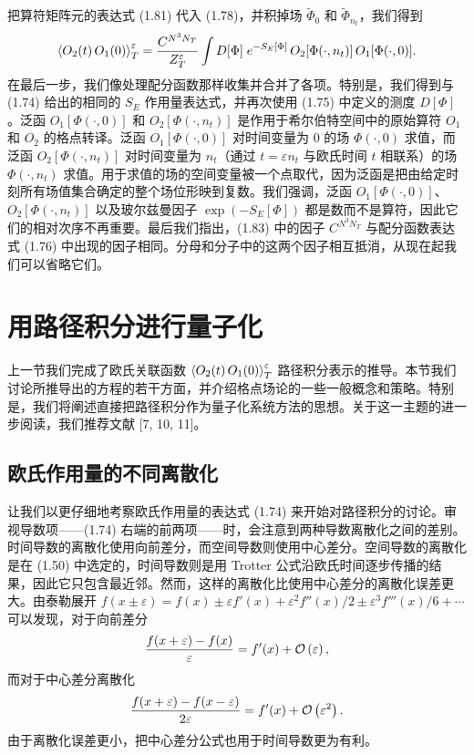 把算符矩阵元的表达式 (1.81) 代入 (1.78)，并积掉场 $\tilde{\Phi}_0$ 和 $\tilde{\Phi}_{n_t}$，我们得到
\begin{equation}
  \left\langle O_2(t)\,O_1(0) \right\rangle_T^\varepsilon
  = \frac{C^{N^3N_T}}{Z_T^\varepsilon}\int D[\Phi]\;e^{-S_E[\Phi]}\,
    O_2[\Phi(\cdot,n_t)]\,O_1[\Phi(\cdot,0)].
\end{equation}
在最后一步，我们像处理配分函数那样收集并合并了各项。特别是，我们得到与 (1.74) 给出的相同的 $S_E$ 作用量表达式，并再次使用 (1.75) 中定义的测度 $D[\Phi]$。泛函 $O_1[\Phi(\cdot,0)]$ 和 $O_2[\Phi(\cdot,n_t)]$ 是作用于希尔伯特空间中的原始算符 $O_1$ 和 $O_2$ 的格点转译。泛函 $O_1[\Phi(\cdot,0)]$ 对时间变量为 0 的场 $\Phi(\cdot,0)$ 求值，而泛函 $O_2[\Phi(\cdot,n_t)]$ 对时间变量为 $n_t$（通过 $t = \varepsilon n_t$ 与欧氏时间 $t$ 相联系）的场 $\Phi(\cdot,n_t)$ 求值。用于求值的场的空间变量被一个点取代，因为泛函是把由给定时刻所有场值集合确定的整个场位形映到复数。我们强调，泛函 $O_1[\Phi(\cdot,0)]$、$O_2[\Phi(\cdot,n_t)]$ 以及玻尔兹曼因子 $\exp(-S_E[\Phi])$ 都是数而不是算符，因此它们的相对次序不再重要。最后我们指出，(1.83) 中的因子 $C^{N^3N_T}$ 与配分函数表达式 (1.76) 中出现的因子相同。分母和分子中的这两个因子相互抵消，从现在起我们可以省略它们。

\section{用路径积分进行量子化}

上一节我们完成了欧氏关联函数 $\left\langle O_2(t)\,O_1(0) \right\rangle_T^\varepsilon$ 路径积分表示的推导。本节我们讨论所推导出的方程的若干方面，并介绍格点场论的一些一般概念和策略。特别是，我们将阐述直接把路径积分作为量子化系统方法的思想。关于这一主题的进一步阅读，我们推荐文献 [7, 10, 11]。

\subsection{欧氏作用量的不同离散化}

让我们以更仔细地考察欧氏作用量的表达式 (1.74) 来开始对路径积分的讨论。审视导数项——(1.74) 右端的前两项——时，会注意到两种导数离散化之间的差别。时间导数的离散化使用向前差分，而空间导数则使用中心差分。空间导数的离散化是在 (1.50) 中选定的，时间导数则是用 Trotter 公式沿欧氏时间逐步传播的结果，因此它只包含最近邻。然而，这样的离散化比使用中心差分的离散化误差更大。由泰勒展开 $f(x \pm \varepsilon) = f(x) \pm \varepsilon f'(x) + \varepsilon^2 f''(x)/2 \pm \varepsilon^3 f'''(x)/6 + \cdots$ 可以发现，对于向前差分
\begin{equation}
  \frac{f(x+\varepsilon) - f(x)}{\varepsilon} = f'(x) + \mathcal{O}\left(\varepsilon\right),
\end{equation}
而对于中心差分离散化
\begin{equation}
  \frac{f(x+\varepsilon) - f(x-\varepsilon)}{2\varepsilon}
  = f'(x) + \mathcal{O}\left(\varepsilon^2\right).
\end{equation}
由于离散化误差更小，把中心差分公式也用于时间导数更为有利。

